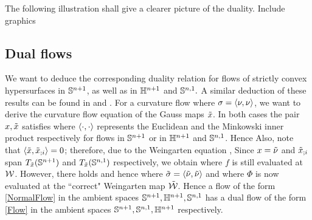 The following illustration shall give a clearer picture of the duality.
{\color{red}Include graphics}
\subsection{Dual flows}
We want to deduce the corresponding duality relation for flows of strictly convex hypersurfaces in $\S^{n+1}$, as well as in $\H^{n+1}$ and $\S^{n,1}.$ A similar deduction of these results can be found in \cite[Sec.~4]{Gerhardt:/2015} and \cite{Yu:04/2016}.
For a curvature flow
where $\s=\ip{\nu}{\nu}$, we want to derive the curvature flow equation of the Gauss maps $\~x$. In both cases the pair $x,\~x$ satisfies
where $\ip{\cdot}{\cdot}$ represents the Euclidean and the Minkowski inner product respectively for flows in $\S^{n+1}$ or in $\H^{n+1}$ and $\S^{n,1}$.
Hence
 Also, note that $\ip{\~x}{\~x_{;i}}=0$; therefore, due to the Weingarten equation \cite[Lem.~9.2.4, Lem.~10.4.3]{Gerhardt:/2006},
Since $x=\~\nu$ and $\~x_{;i}$ span $T_{\~x}(\S^{n+1})$ and $T_{\~x}(\S^{n,1})$ respectively, we obtain
where $f$ is still evaluated at $\mc{W}$. However, there holds
and hence
where $\~\s=\ip{\~\nu}{\~\nu}$ and where $\Phi$ is now evaluated at the ``correct" Weingarten map $\~{\mc{W}}$. Hence a flow of the form
\eqref{NormalFlow} in the ambient spaces $\S^{n+1}, \H^{n+1},\S^{n,1}$ has a dual flow of the form \eqref{Flow} in the ambient spaces $\S^{n+1}, \S^{n,1},\H^{n+1}$ respectively.
